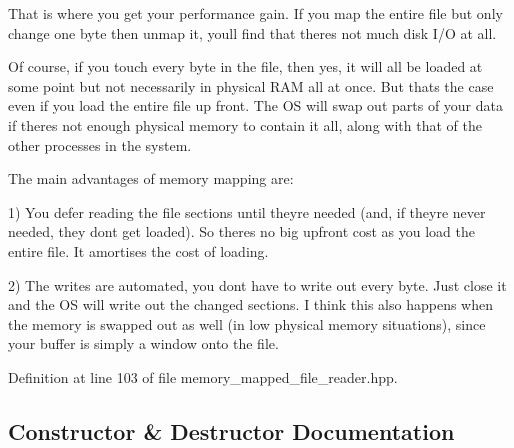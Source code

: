 That is where you get your performance gain. If you map the entire file but only change one byte then unmap it, you\textquotesingle{}ll find that there\textquotesingle{}s not much disk I/\+O at all.

Of course, if you touch every byte in the file, then yes, it will all be loaded at some point but not necessarily in physical R\+A\+M all at once. But that\textquotesingle{}s the case even if you load the entire file up front. The O\+S will swap out parts of your data if there\textquotesingle{}s not enough physical memory to contain it all, along with that of the other processes in the system.

The main advantages of memory mapping are\+:

1) You defer reading the file sections until they\textquotesingle{}re needed (and, if they\textquotesingle{}re never needed, they don\textquotesingle{}t get loaded). So there\textquotesingle{}s no big upfront cost as you load the entire file. It amortises the cost of loading.

2) The writes are automated, you don\textquotesingle{}t have to write out every byte. Just close it and the O\+S will write out the changed sections. I think this also happens when the memory is swapped out as well (in low physical memory situations), since your buffer is simply a window onto the file. 

Definition at line 103 of file memory\+\_\+mapped\+\_\+file\+\_\+reader.\+hpp.



\subsection{Constructor \& Destructor Documentation}
\hypertarget{classuva_1_1utils_1_1file_1_1memory__mapped__file__reader_a25cc1f08c01bb10ebf9911774e2be339}{}
